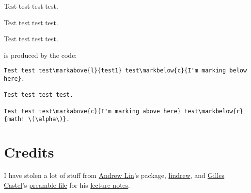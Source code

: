 \documentclass[10pt,letterpaper]{amsart}
\begin{document}
\begin{framed}
Test test test test.

Test test test test.

Test test test test.
\end{framed}

\noindent
is produced by the code:

\begin{verbatim}
Test test test\markabove{l}{test1} test\markbelow{c}{I'm marking below here}.

Test test test test.

Test test test\markabove{c}{I'm marking above here} test\markbelow{r}{math! \(\alpha\)}.
\end{verbatim}


\section{Credits}
I have stolen a lot of stuff from \href{https://web.stanford.edu/~lindrew/}{Andrew Lin}'s package, \href{https://web.stanford.edu/~lindrew/lindrew.sty}{lindrew}, and \href{https://github.com/gillescastel}{Gilles Castel}'s \href{https://github.com/gillescastel/lecture-notes/blob/master/algebraic-topology/preamble.tex}{preamble file} for his \href{https://github.com/gillescastel/lecture-notes}{lecture notes}. 
\end{document}
